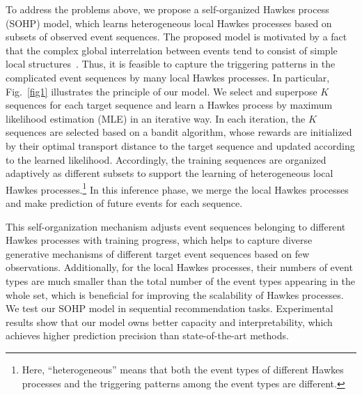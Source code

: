 \documentclass[runningheads]{llncs}
\begin{document}
To address the problems above, we propose a self-organized Hawkes process (SOHP) model, which learns heterogeneous local Hawkes processes based on subsets of observed event sequences. 
The proposed model is motivated by a fact that the complex global interrelation between events tend to consist of simple local structures~\cite{lee2013local,lee2014local}. 
Thus, it is feasible to capture the triggering patterns in the complicated event sequences by many local Hawkes processes. 
In particular, Fig.~\ref{fig1} illustrates the principle of our model. 
We select and superpose $K$ sequences for each target sequence and learn a Hawkes process by maximum likelihood estimation (MLE) in an iterative way.
In each iteration, the $K$ sequences are selected based on a bandit algorithm, whose rewards are initialized by their optimal transport distance to the target sequence and updated according to the learned likelihood. 
Accordingly, the training sequences are organized adaptively as different subsets to support the learning of heterogeneous local Hawkes processes.\footnote{Here, ``heterogeneous'' means that both the event types of different Hawkes processes and the triggering patterns among the event types are different.}
In this inference phase, we merge the local Hawkes processes and make prediction of future events for each sequence.

This self-organization mechanism adjusts event sequences belonging to different Hawkes processes with training progress, which helps to capture diverse generative mechanisms of different target event sequences based on few observations. 
Additionally, for the local Hawkes processes, their numbers of event types are much smaller than the total number of the event types appearing in the whole set, which is beneficial for improving the scalability of Hawkes processes. 
We test our SOHP model in sequential recommendation tasks. 
Experimental results show that our model owns better capacity and interpretability, which achieves higher prediction precision than state-of-the-art methods.





\end{document}
